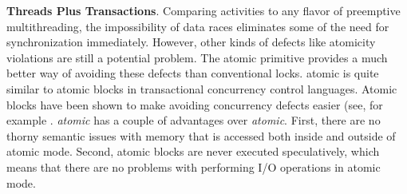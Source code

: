\documentclass[9pt,preprint]{sigplanconf}
\begin{document}
\textbf{Threads Plus Transactions}.
Comparing activities to any flavor of preemptive multithreading, the impossibility of data races eliminates some of the need for synchronization immediately.
However, other kinds of defects like atomicity violations are still a potential problem.
The atomic primitive provides a much better way of avoiding these defects than conventional locks.
atomic is quite similar to atomic blocks in transactional concurrency control languages.
Atomic blocks have been shown to make avoiding concurrency defects easier (see, for example \cite{Harris2005, Grossman2007}.
\emph{atomic} has a couple of advantages over \emph{atomic}.
First, there are no thorny semantic issues with memory that is accessed both inside and outside of atomic mode.
Second, atomic blocks are never executed speculatively, which means that there are no problems with performing I/O operations in atomic mode.




\end{document}
